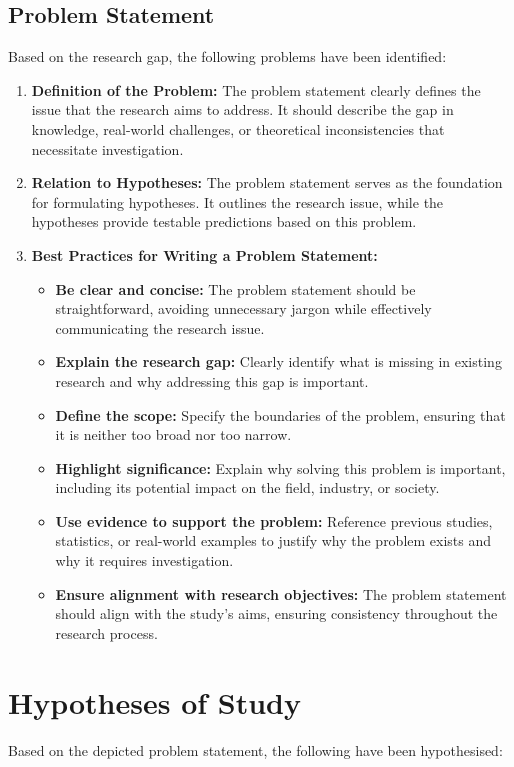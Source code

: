 \subsection{Problem Statement}

Based on the research gap, the following problems have been identified:

\begin{enumerate}
    \item \textbf{Definition of the Problem:} The problem statement clearly defines the issue that the research aims to address. It should describe the gap in knowledge, real-world challenges, or theoretical inconsistencies that necessitate investigation.

    \item \textbf{Relation to Hypotheses:} The problem statement serves as the foundation for formulating hypotheses. It outlines the research issue, while the hypotheses provide testable predictions based on this problem.

    \item \textbf{Best Practices for Writing a Problem Statement:}
    \begin{itemize}
        \item \textbf{Be clear and concise:} The problem statement should be straightforward, avoiding unnecessary jargon while effectively communicating the research issue.
        \item \textbf{Explain the research gap:} Clearly identify what is missing in existing research and why addressing this gap is important.
        \item \textbf{Define the scope:} Specify the boundaries of the problem, ensuring that it is neither too broad nor too narrow.
        \item \textbf{Highlight significance:} Explain why solving this problem is important, including its potential impact on the field, industry, or society.
        \item \textbf{Use evidence to support the problem:} Reference previous studies, statistics, or real-world examples to justify why the problem exists and why it requires investigation.
        \item \textbf{Ensure alignment with research objectives:} The problem statement should align with the study’s aims, ensuring consistency throughout the research process.
    \end{itemize}
\end{enumerate}


\section{Hypotheses of Study}
Based on the depicted problem statement, the following have been hypothesised:

